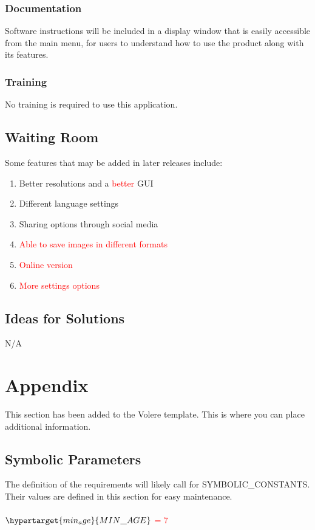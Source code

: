 \documentclass[12pt, titlepage]{article}
\begin{document}
\subsubsection{Documentation}

Software instructions will be included in a display window that is easily accessible from the main menu, for users to understand how to use the product along with its features.

\subsubsection{Training}

No training is required to use this application. 

\subsection{Waiting Room}

Some features that may be added in later releases include:

\begin{enumerate}
    \item Better resolutions and a \textcolor{red}{better} GUI
    \item Different language settings
    \item Sharing options through social media
    \item \textcolor{red}{Able to save images in different formats}
    \item \textcolor{red}{Online version}
    \item \textcolor{red}{More settings options}
\end{enumerate}

\subsection{Ideas for Solutions}

N/A





\newpage

\section{Appendix}

This section has been added to the Volere template.  This is where you can place
additional information.

\subsection{Symbolic Parameters}

The definition of the requirements will likely call for SYMBOLIC\_CONSTANTS.
Their values are defined in this section for easy maintenance. \\ \\
\textcolor{red}{$\hypertarget{min_age}{MIN\_AGE}$ = 7} \\
\end{document}

